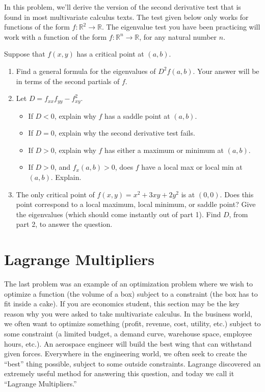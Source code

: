 In this problem, we'll derive the version of the second derivative test that is found in most multivariate calculus texts.  The test given below only works for functions of the form $f:\mathbb{R}^2\to\mathbb{R}$.  The eigenvalue test you have been practicing will work with a function of the form  $f:\mathbb{R}^n\to\mathbb{R}$, for any natural number $n$. 
\begin{problem}[Optional]
 Suppose that $f(x,y)$ has a critical point at $(a,b)$.
\begin{enumerate}
 \item Find a general formula for the eigenvalues of $D^2f(a,b)$. Your answer will be in terms of the second partials of $f$.
 \item Let $D=f_{xx}f_{yy}-f_{xy}^2$. 
\begin{itemize}
 \item If $D<0$, explain why $f$ has a saddle point at $(a,b)$.
 \item If $D=0$, explain why the second derivative test fails.
 \item If $D>0$, explain why $f$ has either a maximum or minimum at $(a,b)$.
 \item If $D>0$, and $f_x(a,b)>0$, does $f$ have a local max or local min at $(a,b)$. Explain.
\end{itemize}
 \item The only critical point of $f(x,y) = x^2+3xy+2y^2$ is at $(0,0)$.  Does this point correspond to a local maximum, local minimum, or saddle point? Give the eigenvalues (which should come instantly out of part 1). Find $D$, from part 2, to answer the question.
\end{enumerate}

\end{problem}

\section{Lagrange Multipliers}
The last problem was an example of an optimization problem where we wish to optimize a function (the volume of a box) subject to a constraint (the box has to fit inside a cake).  If you are economics student, this section may be the key reason why you were asked to take multivariate calculus.  In the business world, we often want to optimize something (profit, revenue, cost, utility, etc.) subject to some constraint (a limited budget, a demand curve, warehouse space, employee hours, etc.). An aerospace engineer will build the best wing that can withstand given forces. Everywhere in the engineering world, we often seek to create the ``best'' thing possible, subject to some outside constraints.  Lagrange discovered an extremely useful method for answering this question, and today we call it ``Lagrange Multipliers.''

